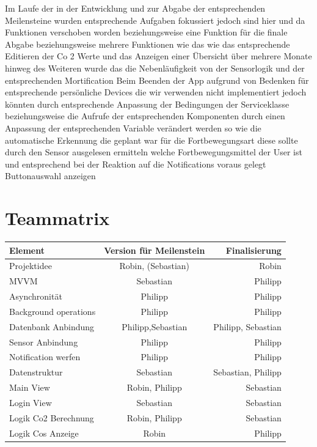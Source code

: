 \documentclass{article}
\begin{document}
 	
 	Im Laufe der in der Entwicklung und zur Abgabe der entsprechenden Meilensteine wurden entsprechende Aufgaben fokussiert jedoch sind hier und da Funktionen verschoben worden beziehungsweise eine Funktion für die finale Abgabe beziehungsweise mehrere Funktionen wie das wie das entsprechende Editieren der Co 2 Werte und das Anzeigen einer Übersicht über mehrere Monate hinweg des Weiteren wurde das die Nebenläufigkeit von der Sensorlogik und der entsprechenden Mortification Beim Beenden der App aufgrund von Bedenken für entsprechende persönliche Devices die wir verwenden nicht implementiert jedoch könnten durch entsprechende Anpassung der Bedingungen der Serviceklasse beziehungsweise die Aufrufe der entsprechenden Komponenten durch einen Anpassung der entsprechenden Variable verändert werden so wie die automatische Erkennung die geplant war für die Fortbewegungsart diese sollte durch den Sensor ausgelesen ermitteln welche Fortbewegungsmittel der User ist und entsprechend bei der Reaktion auf die Notifications voraus gelegt Buttonauswahl anzeigen

  
  
\section{Teammatrix}

\begin{tabular}[h]{l|c|r}
Element & Version für Meilenstein & Finalisierung \\
\hline
Projektidee & Robin, (Sebastian) & Robin\\
\hline
MVVM & Sebastian & Philipp\\
\hline
Asynchronität & Philipp & Philipp\\
\hline
Background operations & Philipp & Philipp\\
\hline
Datenbank Anbindung & Philipp,Sebastian & Philipp, Sebastian\\
\hline
Sensor Anbindung & Philipp & Philipp\\
\hline
Notification werfen & Philipp & Philipp\\
\hline
Datenstruktur & Sebastian & Sebastian, Philipp\\
\hline
Main View & Robin, Philipp & Sebastian\\
\hline
Login View & Sebastian & Sebastian\\
\hline
Logik Co2 Berechnung & Robin, Philipp & Sebastian\\
\hline
Logik Cos Anzeige & Robin & Philipp\\
\end{tabular}
    
\end{document}
